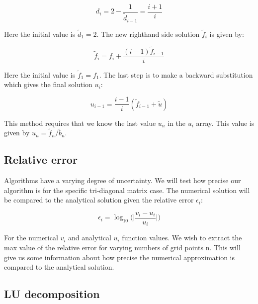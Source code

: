 \documentclass[norsk,a4paper,12pt]{article}
\begin{document}
\begin{equation}
d_i = 2-\frac{1}{\tilde{d}_{i-1}}=\frac{i+1}{i}
 \label{eq:d_i}
 \end{equation}

Here the initial value is $\tilde{d}_1=2$. The new righthand side solution $\tilde{f}_i$ is given by:

\begin{equation}
\tilde{f}_i = f_i + \frac{(i-1)\tilde{f}_{i-1}}{i}
 \label{eq:f_i}
 \end{equation}

Here the initial value is $\tilde{f}_1=f_1$. The last step is to make a backward substitution which gives the final solution $u_i$:

\begin{equation}
u_{i-1}=\frac{i-1}{i}(\tilde{f}_{i-1}+\tilde{u})
 \label{eq:u_i-1}
 \end{equation}
 
 This method requires that we know the last value $u_n$ in the $u_i$ array. This value is given by $u_n=\tilde{f}_n/\tilde{b}_n$. 
 
 \subsection{Relative error}
 
 Algorithms have a varying degree of uncertainty. We will test how precise our algorithm is for the specific tri-diagonal matrix case. The numerical solution will be compared to the analytical solution given the relative error $\epsilon_i$:
 
 \begin{equation}
\epsilon_i = \log_{10}\bigg(\bigg|\frac{v_i-u_i}{u_i}\bigg|\bigg)
 \label{eq:f_i}
 \end{equation}
 
For the numerical $v_i$ and analytical $u_i$ function values. We wish to extract the max value of the relative error for varying numbers of grid points n. This will give us some information about how precise the numerical approximation is compared to the analytical solution.

 \subsection{LU decomposition}
\end{document}
